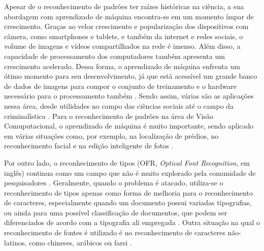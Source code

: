 Apesar de o reconhecimento de padrões ter raízes históricas na ciência, a sua abordagem com aprendizado de máquina encontra-se em um momento ímpar de crescimento. Graças ao veloz crescimento e popularização dos dispositivos com câmera, como smartphones e tablets, e também da internet e redes sociais, o volume de imagens e vídeos compartilhados na rede é imenso. Além disso, a capacidade de processamento dos computadores também apresenta um crescimento acelerado. Dessa forma, o aprendizado de máquina enfrenta um ótimo momento  para seu desenvolvimento, já que está acessível um grande banco de dados de imagens para compor o conjunto de treinamento e o hardware necessário para o processamento também . Sendo assim, várias são as aplicações nessa área, desde utilidades no campo das ciências sociais até o campo da criminalística  . Para o reconhecimento de padrões na área de Visão Comuputacional, o aprendizado de máquina é muito importante, sendo aplicado em várias situações como, por exemplo, na localização de prédios, no reconhecimento facial e na edição inteligente de fotos .

Por outro lado, o reconhecimento de tipos (OFR, \textit{Optical Font Recognition}, em inglês) continua como um campo que não é muito explorado pela comunidade de pesquisadores . Geralmente, quando o problema é atacado, utiliza-se o reconhecimento de tipos apenas como forma de melhoria para o reconhecimento de caracteres, especialmente quando um documento possui variadas tipografias, ou ainda para uma possível classificação de documentos, que podem ser diferenciados de acordo com a tipografia ali empregada  . Outra situação na qual o reconhecimento de fontes é utilizado é no reconhecimento de caracteres não-latinos, como chineses, arábicos ou farsi   .

